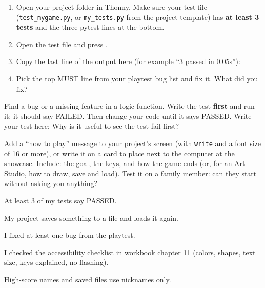\namedateline

\begin{core}
\begin{enumerate}
  \item Open your project folder in Thonny. Make sure your test file (\texttt{test\_mygame.py}, or \texttt{my\_tests.py} from the project template) has \textbf{at least 3 tests} and the three pytest lines at the bottom.
  \item Open the test file and press .
  \item Copy the last line of the output here (for example \enquote{3 passed in 0.05s}): 
  \item Pick the top MUST line from your playtest bug list and fix it. What did you fix? 
\end{enumerate}
\end{core}

\begin{challenge}
Find a bug or a missing feature in a logic function. Write the test \textbf{first} and run it: it
should say FAILED. Then change your code until it says PASSED. Write your test here:
\answerspace{3cm}
Why is it useful to see the test fail first? 
\end{challenge}

\begin{creative}
Add a \enquote{how to play} message to your project's screen (with \texttt{write} and a font size of
16 or more), or write it on a card to place next to the computer at the showcase. Include: the goal,
the keys, and how the game ends (or, for an Art Studio, how to draw, save and load). Test it on a
family member: can they start without asking you anything?
\end{creative}

\begin{selfcheck}
  \item At least 3 of my tests say PASSED.
  \item My project saves something to a file and loads it again.
  \item I fixed at least one bug from the playtest.
  \item I checked the accessibility checklist in workbook chapter 11 (colors, shapes, text size, keys explained, no flashing).
  \item High-score names and saved files use nicknames only.
\end{selfcheck}
